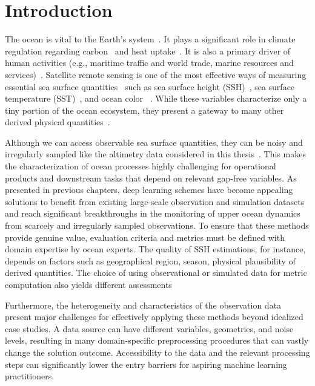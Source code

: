 \section{Introduction}

The ocean is vital to the Earth's system~\cite{OCEANWARMING}. 
It plays a significant role in climate regulation regarding carbon~\cite{OCEANCARBONCYCLE} and heat uptake~\cite{OCEANHEATUPTAKE}. It is also a primary driver of human activities (e.g., maritime traffic and world trade, marine resources and services)~\cite{SSHOPERATIONAL, ML4OCN}. 
Satellite remote sensing is one of the most effective ways of measuring essential sea surface quantities~\cite{Altimetry} such as sea surface height (SSH)~\cite{DUACS}, sea surface temperature (SST)~\cite{OCEANSATELLITESST}, and ocean color ~\cite{OCEANSATELLITEOC}. 
While these variables characterize only a tiny portion of the ocean ecosystem, they present a gateway to many other derived physical quantities~\cite{ML4OCN}.

Although we can access observable sea surface quantities, they can be noisy and irregularly sampled like the altimetry data considered in this thesis~\cite{DUACS}. 
This makes the characterization of ocean processes highly challenging for operational products and downstream tasks that depend on relevant gap-free variables. As presented in previous chapters, deep learning schemes \cite{SSHInterpAttention, SSHInterpConvLSTM, SSHInterpUNet} have become appealing solutions to benefit from existing large-scale observation and simulation datasets and reach significant breakthroughs in the monitoring of upper ocean dynamics from scarcely and irregularly sampled observations. 
To ensure that these methods provide genuine value, evaluation criteria and metrics must be defined with domain expertise by ocean experts. The quality of SSH estimations, for instance, depends on factors such as geographical region, season, physical plausibility of derived quantities. The choice of using observational or simulated data for metric computation also yields different assessments


Furthermore, the heterogeneity and characteristics of the observation data present major challenges for effectively applying these methods beyond idealized case studies. 
A data source can have different variables, geometries, and noise levels, resulting in many domain-specific preprocessing procedures that can vastly change the solution outcome. Accessibility to the data and the relevant processing steps can significantly lower the entry barriers for aspiring machine learning practitioners.


